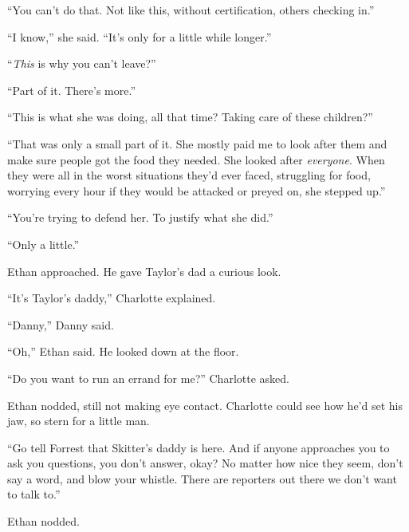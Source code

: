 ``You can't do that.  Not like this, without certification, others checking in.''



``I know,'' she said.  ``It's only for a little while longer.''



``\emph{This} is why you can't leave?''



``Part of it.  There's more.''



``This is what she was doing, all that time?  Taking care of these children?''



``That was only a small part of it.  She mostly paid me to look after them and make sure people got the food they needed.  She looked after \emph{everyone}.  When they were all in the worst situations they'd ever faced, struggling for food, worrying every hour if they would be attacked or preyed on, she stepped up.''



``You're trying to defend her.  To justify what she did.''



``Only a little.''



Ethan approached.  He gave Taylor's dad a curious look.



``It's Taylor's daddy,'' Charlotte explained.



``Danny,'' Danny said.



``Oh,'' Ethan said.  He looked down at the floor.



``Do you want to run an errand for me?''  Charlotte asked.



Ethan nodded, still not making eye contact.  Charlotte could see how he'd set his jaw, so stern for a little man.



``Go tell Forrest that Skitter's daddy is here.  And if anyone approaches you to ask you questions, you don't answer, okay?  No matter how nice they seem, don't say a word, and blow your whistle.  There are reporters out there we don't want to talk to.''



Ethan nodded.



